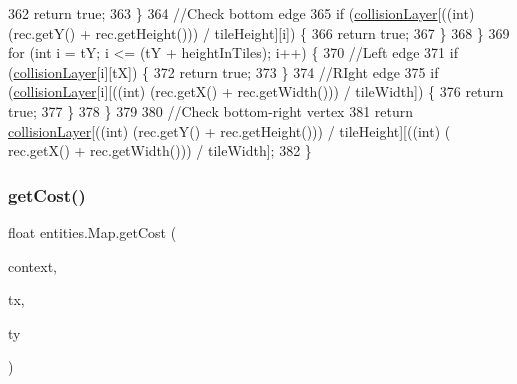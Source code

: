 \begin{DoxyCode}
362                 \textcolor{keywordflow}{return} \textcolor{keyword}{true};
363             \}
364             \textcolor{comment}{//Check bottom edge}
365             \textcolor{keywordflow}{if} (\mbox{\hyperlink{classentities_1_1_map_af7f17d81b7e3bd4e1897f8fb7f89f855}{collisionLayer}}[((\textcolor{keywordtype}{int}) (rec.getY() + rec.getHeight())) / tileHeight][i]) \{
366                 \textcolor{keywordflow}{return} \textcolor{keyword}{true};
367             \}
368         \}
369         \textcolor{keywordflow}{for} (\textcolor{keywordtype}{int} i = tY; i <= (tY + heightInTiles); i++) \{
370             \textcolor{comment}{//Left edge }
371             \textcolor{keywordflow}{if} (\mbox{\hyperlink{classentities_1_1_map_af7f17d81b7e3bd4e1897f8fb7f89f855}{collisionLayer}}[i][tX]) \{
372                 \textcolor{keywordflow}{return} \textcolor{keyword}{true};
373             \}
374             \textcolor{comment}{//RIght edge}
375             \textcolor{keywordflow}{if} (\mbox{\hyperlink{classentities_1_1_map_af7f17d81b7e3bd4e1897f8fb7f89f855}{collisionLayer}}[i][((\textcolor{keywordtype}{int}) (rec.getX() + rec.getWidth())) / tileWidth]) \{
376                 \textcolor{keywordflow}{return} \textcolor{keyword}{true};
377             \}
378         \}
379 
380         \textcolor{comment}{//Check bottom-right vertex }
381         \textcolor{keywordflow}{return} \mbox{\hyperlink{classentities_1_1_map_af7f17d81b7e3bd4e1897f8fb7f89f855}{collisionLayer}}[((int) (rec.getY() + rec.getHeight())) / tileHeight][((int) (
      rec.getX() + rec.getWidth())) / tileWidth];
382     \}
\end{DoxyCode}
\mbox{\label{classentities_1_1_map_a251d9d490fc34a64fa2b67798c9a44a7}} 
\subsubsection{\texorpdfstring{get\+Cost()}{getCost()}}
{\footnotesize\ttfamily float entities.\+Map.\+get\+Cost (\begin{DoxyParamCaption}\item[{\mbox{\hyperlink{interfaceorg_1_1newdawn_1_1slick_1_1util_1_1pathfinding_1_1_path_finding_context}{Path\+Finding\+Context}}}]{context,  }\item[{int}]{tx,  }\item[{int}]{ty }\end{DoxyParamCaption})\hspace{0.3cm}{\ttfamily [inline]}}

